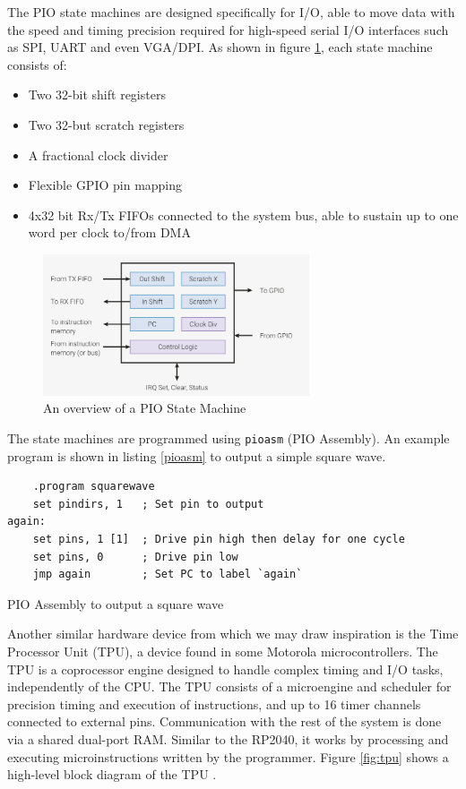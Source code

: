 \documentclass[a4paper,fleqn,12pt]{article}
\begin{document}
The PIO state machines are designed specifically for I/O, able to move data with the speed and timing precision required for high-speed serial I/O interfaces such as SPI, UART and even VGA/DPI. As shown in figure \ref{fig:pio-sm}, each state machine consists of:

\begin{itemize}
    \item Two 32-bit shift registers
    \item Two 32-but scratch registers
    \item A fractional clock divider
    \item Flexible GPIO pin mapping
    \item 4x32 bit Rx/Tx FIFOs connected to the system bus, able to sustain up to one word per clock to/from DMA
\end{itemize}

\begin{figure}[H]
    \centering
    \includegraphics[width=0.7\textwidth]{../img/rp2040-state-machine.png}
    \caption{An overview of a PIO State Machine \cite{rp2040}}
    \label{fig:pio-sm}
\end{figure}

The state machines are programmed using \texttt{pioasm} (PIO Assembly). An example program is shown in listing \ref{pioasm} to output a simple square wave.

\begin{listing}[b]
    \vspace{0.5cm}
    \begin{verbatim}
    .program squarewave
    set pindirs, 1   ; Set pin to output
again:
    set pins, 1 [1]  ; Drive pin high then delay for one cycle
    set pins, 0      ; Drive pin low
    jmp again        ; Set PC to label `again`
    \end{verbatim}
    \caption{PIO Assembly to output a square wave \cite{rp2040}}
    \label{pioasm}
\end{listing}

Another similar hardware device from which we may draw inspiration is the Time Processor Unit (TPU), a device found in some Motorola microcontrollers. The TPU is a coprocessor engine designed to handle complex timing and I/O tasks, independently of the CPU. The TPU consists of a microengine and scheduler for precision timing and execution of instructions, and up to 16 timer channels connected to external pins. Communication with the rest of the system is done via a shared dual-port RAM. Similar to the RP2040, it works by processing and executing microinstructions written by the programmer. Figure \ref{fig:tpu} shows a high-level block diagram of the TPU \cite{tpu}.
\end{document}

